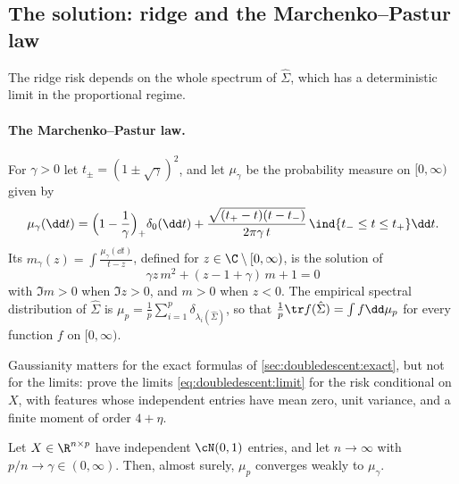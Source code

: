 \begin{refsection}
\section{The solution: ridge and the Marchenko--Pastur law}\label{sec:doubledescent:ridge}

The ridge risk depends on the whole spectrum of $\hat\Sigma$, which has a deterministic limit in the proportional regime.

\paragraph{The Marchenko--Pastur law.} For $\gamma>0$ let $t_\pm=(1\pm\sqrt\gamma)^2$, and let $\mu_\gamma$ be the probability measure on $[0,\infty)$ given by
\begin{equation}\label{eq:doubledescent:mp}
  \mu_\gamma(\dd t)=\Bigl(1-\frac1\gamma\Bigr)_+\delta_0(\dd t)+\frac{\sqrt{(t_+-t)(t-t_-)}}{2\pi\gamma\,t}\,\ind\{t_-\le t\le t_+\}\dd t .
\end{equation}
Its  $m_\gamma(z)=\int\frac{\mu_\gamma(\dd t)}{t-z}$, defined for $z\in\C\setminus[0,\infty)$, is the solution of
\begin{equation}\label{eq:doubledescent:mpquad}
  \gamma z\,m^2+(z-1+\gamma)\,m+1=0
\end{equation}
with $\Im m>0$ when $\Im z>0$, and $m>0$ when $z<0$. The empirical spectral distribution of $\hat\Sigma$ is $\mu_p=\frac1p\sum_{i=1}^p\delta_{\lambda_i(\hat\Sigma)}$, so that $\frac1p\tr f(\hat\Sigma)=\int f\dd\mu_p$ for every function $f$ on $[0,\infty)$.

Gaussianity matters for the exact formulas of \cref{sec:doubledescent:exact}, but not for the limits: \textcite{HastieEtAl2022} prove the limits \eqref{eq:doubledescent:limit} for the risk conditional on $X$, with features whose independent entries have mean zero, unit variance, and a finite moment of order $4+\eta$.

\begin{theorem}\label{thm:doubledescent:mp}
Let $X\in\R^{n\times p}$ have independent $\cN(0,1)$ entries, and let $n\to\infty$ with $p/n\to\gamma\in(0,\infty)$. Then, almost surely, $\mu_p$ converges weakly to $\mu_\gamma$.
\end{theorem}


\end{refsection}
